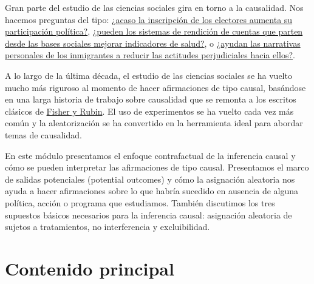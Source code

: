 \documentclass[
  12pt,
  spanish,
]{book}
\begin{document}
Gran parte del estudio de las ciencias sociales gira en torno a la causalidad. Nos hacemos preguntas del tipo: \href{https://egap.org/resource/electoral-administration-in-kenya/}{¿acaso la inscripción de los electores aumenta su participación política?}, \href{https:\%20//\%20egap.org/resource/does-bottom-up-accountability-work-evidence-from-uganda/}{¿pueden los sistemas de rendición de cuentas que parten desde las bases sociales mejorar indicadores de salud?}, o \href{https://egap.org/resource/brief\%20-70-cómo-las-narrativas-personales-reducen-las-actitudes-negativas-hacia-los-inmigrantes-en-Kenia\%20/}{¿ayudan las narrativas personales de los inmigrantes a reducir las actitudes perjudiciales hacia ellos?}.

A lo largo de la última década, el estudio de las ciencias sociales se ha vuelto mucho más riguroso al momento de hacer afirmaciones de tipo causal, basándose en una larga historia de trabajo sobre causalidad que se remonta a los escritos clásicos de \protect\hyperlink{ux5cux2520causalinference-classics}{Fisher y Rubin}. El uso de experimentos se ha vuelto cada vez más común y la aleatorización se ha convertido en la herramienta ideal para abordar temas de causalidad.

En este módulo presentamos el enfoque contrafactual de la inferencia causal y cómo se pueden interpretar las afirmaciones de tipo causal. Presentamos el marco de salidas potenciales (potential outcomes) y cómo la asignación aleatoria nos ayuda a hacer afirmaciones sobre lo que habría sucedido en ausencia de alguna política, acción o programa que estudiamos. También discutimos los tres supuestos básicos necesarios para la inferencia causal: asignación aleatoria de sujetos a tratamientos, no interferencia y excluibilidad.

\hypertarget{contenido-principal-1}{%
\section{Contenido principal}\label{contenido-principal-1}}
\end{document}

